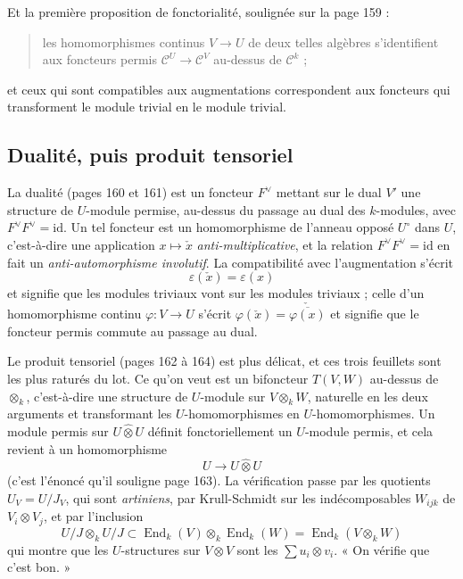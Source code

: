 \documentclass[11pt,a4paper]{article}
\begin{document}
Et la première proposition de fonctorialité, soulignée sur la page 159 :
\begin{quote}
les homomorphismes continus $V \to U$ de deux telles algèbres s'identifient aux
foncteurs permis $\mathcal{C}^{U} \to \mathcal{C}^{V}$ au-dessus de
$\mathcal{C}^{k}$ ;
\end{quote}
et ceux qui sont compatibles aux augmentations correspondent aux foncteurs qui
transforment le module trivial en le module trivial.

\subsection*{Dualité, puis produit tensoriel}

La dualité (pages 160 et 161) est un foncteur $F^{\vee}$ mettant sur le dual
$V'$ une structure de $U$-module permise, au-dessus du passage au dual des
$k$-modules, avec $F^{\vee}F^{\vee} = \mathrm{id}$. Un tel foncteur est un
homomorphisme de l'anneau opposé $U^{\circ}$ dans $U$, c'est-à-dire une
application $x \mapsto \check{x}$ \emph{anti-multiplicative}, et la relation
$F^{\vee}F^{\vee} = \mathrm{id}$ en fait un \emph{anti-automorphisme
involutif}. La compatibilité avec l'augmentation s'écrit
\[
\varepsilon(\check{x}) = \varepsilon(x)
\]
et signifie que les modules triviaux vont sur les modules triviaux ; celle d'un
homomorphisme continu $\varphi \colon V \to U$ s'écrit $\varphi(\check{x}) =
\check{\overline{\varphi(x)}}$ et signifie que le foncteur permis commute au
passage au dual.

Le produit tensoriel (pages 162 à 164) est plus délicat, et ces trois feuillets
sont les plus raturés du lot. Ce qu'on veut est un bifoncteur $T(V,W)$
au-dessus de $\otimes_{k}$, c'est-à-dire une structure de $U$-module sur
$V \otimes_{k}W$, naturelle en les deux arguments et transformant les
$U$-homomorphismes en $U$-homomorphismes. Un module
permis sur $U \mathbin{\widehat{\otimes}} U$ définit fonctoriellement un
$U$-module permis, et cela revient à un homomorphisme
\[
\boxed{\ U \longrightarrow U \mathbin{\widehat{\otimes}} U\ }
\]
(c'est l'énoncé qu'il souligne page 163). La vérification passe par les quotients
$U_{V} = U/J_{V}$, qui sont \emph{artiniens}, par Krull-Schmidt sur les
indécomposables $W_{ijk}$ de $V_{i} \otimes V_{j}$, et par l'inclusion
\[
U/J \otimes_{k} U/J \subset
\operatorname{End}_{k}(V) \otimes_{k} \operatorname{End}_{k}(W)
= \operatorname{End}_{k}(V \otimes_{k} W)
\]
qui montre que les $U$-structures sur $V \otimes V$ sont les $\sum u_{i}
\otimes v_{i}$. « On vérifie que c'est bon. »
\end{document}
